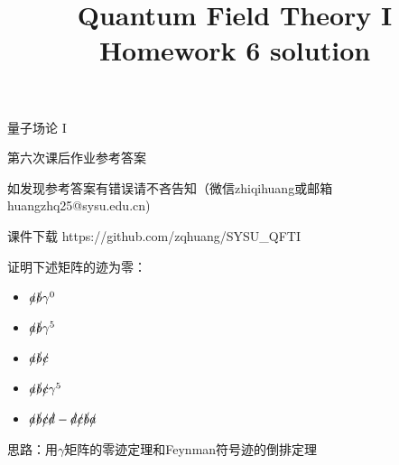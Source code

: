 \documentclass[CJK]{beamer}
\title{Quantum Field Theory I \\ Homework 6 solution}
\author{}
\date{}
\begin{document}
\begin{frame}
 
\begin{center}
\begin{Large}
\bch
量子场论 I 

{\vskip 0.3in}

第六次课后作业参考答案
\skipline
\skipline

如发现参考答案有错误请不吝告知（微信zhiqihuang或邮箱huangzhq25@sysu.edu.cn)
\ech
\end{Large}
\end{center}

\vskip 0.2in

\bch
课件下载
\ech
https://github.com/zqhuang/SYSU\_QFTI

\end{frame}


\begin{frame}
\bch
{\small
证明下述矩阵的迹为零：
\begin{itemize}
\item{$\slashed{a}\slashed{b}\gamma^0$}
\item{$\slashed{a}\slashed{b}\gamma^5$}
\item{$\slashed{a}\slashed{b}\slashed{c}$}
\item{$\slashed{a}\slashed{b}\slashed{c}\gamma^5$}
\item{$\slashed{a}\slashed{b}\slashed{c}\slashed{d}-\slashed{d}\slashed{c}\slashed{b}\slashed{a}$}
\end{itemize}

\skipline
思路：用$\gamma$矩阵的零迹定理和Feynman符号迹的倒排定理
}


\ech
\end{frame}
\end{document}
